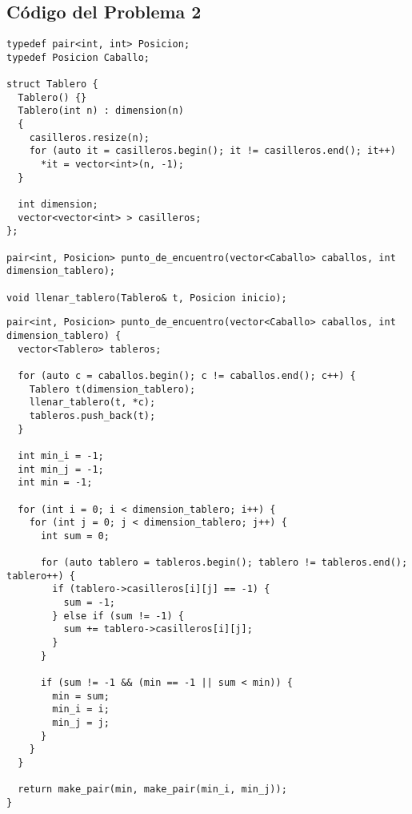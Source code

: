 \documentclass[a4paper]{article}
\begin{document}





\subsection{Código del Problema 2}


\begin{lstlisting}
typedef pair<int, int> Posicion;
typedef Posicion Caballo;

struct Tablero {
  Tablero() {}
  Tablero(int n) : dimension(n)
  {
    casilleros.resize(n);
    for (auto it = casilleros.begin(); it != casilleros.end(); it++)
      *it = vector<int>(n, -1);
  }

  int dimension;
  vector<vector<int> > casilleros;
};

pair<int, Posicion> punto_de_encuentro(vector<Caballo> caballos, int dimension_tablero);

void llenar_tablero(Tablero& t, Posicion inicio);
\end{lstlisting}


\vspace*{0.5cm}


\begin{lstlisting}
pair<int, Posicion> punto_de_encuentro(vector<Caballo> caballos, int dimension_tablero) {
  vector<Tablero> tableros;

  for (auto c = caballos.begin(); c != caballos.end(); c++) {
    Tablero t(dimension_tablero);
    llenar_tablero(t, *c);
    tableros.push_back(t);
  }

  int min_i = -1;
  int min_j = -1;
  int min = -1;

  for (int i = 0; i < dimension_tablero; i++) {
    for (int j = 0; j < dimension_tablero; j++) {
      int sum = 0;

      for (auto tablero = tableros.begin(); tablero != tableros.end(); tablero++) {
        if (tablero->casilleros[i][j] == -1) {
          sum = -1;
        } else if (sum != -1) {
          sum += tablero->casilleros[i][j];
        }
      }

      if (sum != -1 && (min == -1 || sum < min)) {
        min = sum;
        min_i = i;
        min_j = j;
      }
    }
  }

  return make_pair(min, make_pair(min_i, min_j));
}
\end{lstlisting}
\end{document}
